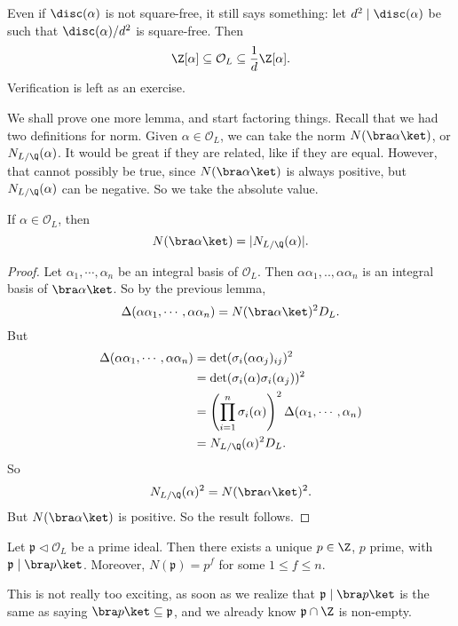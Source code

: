 \documentclass[a4paper]{article}
\begin{document}
Even if $\disc(\alpha)$ is not square-free, it still says something: let $d^2 \mid \disc(\alpha)$ be such that $\disc(\alpha)/d^2$ is square-free. Then
\[
  \Z[\alpha] \subseteq \mathcal{O}_L \subseteq \frac{1}{d} \Z[\alpha].
\]
Verification is left as an exercise. %

We shall prove one more lemma, and start factoring things. Recall that we had two definitions for norm. Given $\alpha \in \mathcal{O}_L$, we can take the norm $N(\bra \alpha\ket)$, or $N_{L/\Q}(\alpha)$. It would be great if they are related, like if they are equal. However, that cannot possibly be true, since $N(\bra \alpha\ket)$ is always positive, but $N_{L/\Q}(\alpha)$ can be negative. So we take the absolute value.
\begin{lemma}
  If $\alpha \in \mathcal{O}_L$, then
  \[
    N(\bra \alpha\ket) = |N_{L/\Q}(\alpha)|.
  \]
\end{lemma}

\begin{proof}
  Let $\alpha_1, \cdots, \alpha_n$ be an integral basis of $\mathcal{O}_L$. Then $\alpha\alpha_1, .., \alpha\alpha_n$ is an integral basis of $\bra \alpha\ket$. So by the previous lemma,
  \[
    \Delta(\alpha \alpha_1, \cdots, \alpha\alpha_n) = N(\bra \alpha\ket)^2 D_L.
  \]
  But
  \begin{align*}
    \Delta (\alpha \alpha_1, \cdots, \alpha\alpha_n) &= \det(\sigma_i(\alpha\alpha_j)_{ij})^2 \\
    &= \det(\sigma_i(\alpha)\sigma_i(\alpha_j))^2\\
    &= \left(\prod_{i = 1}^n \sigma_i(\alpha)\right)^2 \Delta(\alpha_1, \cdots, \alpha_n)\\
    &= N_{L/\Q}(\alpha)^2 D_L.
  \end{align*}
  So
  \[
    N_{L/\Q}(\alpha)^2 = N(\bra \alpha\ket)^2.
  \]
  But $N(\bra \alpha\ket)$ is positive. So the result follows.
\end{proof}

\begin{lemma}
  Let $\mathfrak{p} \lhd \mathcal{O}_L$ be a prime ideal. Then there exists a unique $p \in \Z$, $p$ prime, with $\mathfrak{p} \mid \bra p\ket$. Moreover, $N(\mathfrak{p}) = p^f$ for some $1 \leq f \leq n$.
\end{lemma}
This is not really too exciting, as soon as we realize that $\mathfrak{p} \mid \bra p\ket$ is the same as saying $\bra p\ket \subseteq \mathfrak{p}$, and we already know $\mathfrak{p} \cap \Z$ is non-empty.
\end{document}
